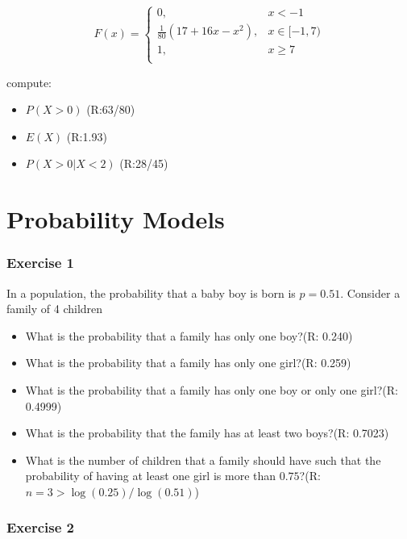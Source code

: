 \documentclass[
]{book}
\providecommand{\tightlist}{%
  \setlength{\itemsep}{0pt}\setlength{\parskip}{0pt}}
\begin{document}
\[
    F(x)= 
\begin{cases}
0, & x  < -1 \\
\frac{1}{80}(17+16x-x^2),& x \in [-1,7)\\
1,& x \geq 7\\
\end{cases}
\]

compute:

\begin{itemize}
\tightlist
\item
  \(P(X>0)\) (R:63/80)
\item
  \(E(X)\) (R:1.93)
\item
  \(P(X>0|X<2)\) (R:28/45)
\end{itemize}

\hypertarget{probability-models}{%
\section{Probability Models}\label{probability-models}}

\hypertarget{exercise-1-4}{%
\subsubsection{Exercise 1}\label{exercise-1-4}}

In a population, the probability that a baby boy is born is \(p=0.51\). Consider a family of 4 children

\begin{itemize}
\tightlist
\item
  What is the probability that a family has only one boy?(R: 0.240)
\item
  What is the probability that a family has only one girl?(R: 0.259)
\item
  What is the probability that a family has only one boy or only one girl?(R: 0.4999)
\item
  What is the probability that the family has at least two boys?(R: 0.7023)
\item
  What is the number of children that a family should have such that the probability of having at least one girl is more than \(0.75\)?(R:\(n=3>\log(0.25)/\log(0.51)\))
\end{itemize}

\hypertarget{exercise-2-4}{%
\subsubsection{Exercise 2}\label{exercise-2-4}}
\end{document}
